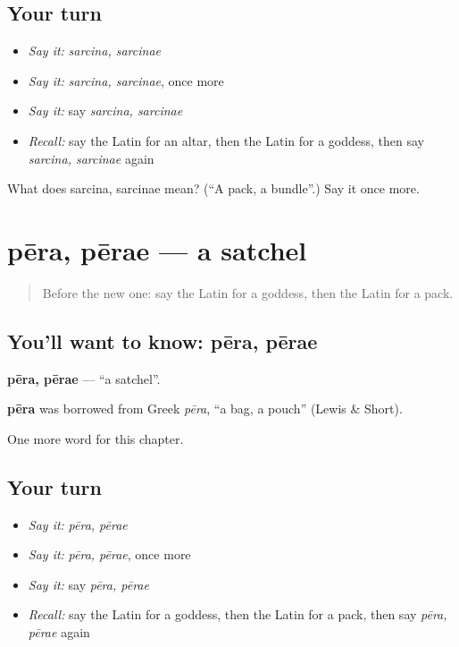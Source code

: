 \subsection*{Your turn}
\begin{itemize}
\raggedright
  \item \emph{Say it:} \emph{sarcina, sarcinae}
  \item \emph{Say it:} \emph{sarcina, sarcinae}, once more
  \item \emph{Say it:} say \emph{sarcina, sarcinae}
  \item \emph{Recall:} say the Latin for an altar, then the Latin for a goddess, then say \emph{sarcina, sarcinae} again
\end{itemize}

\begin{tcolorbox}[breakable,colback=teal!4,colframe=teal!35!black,title={Before you move on}]
What does sarcina, sarcinae mean? (\textquotedblleft{}A pack, a bundle\textquotedblright{}.) Say it once more.
\end{tcolorbox}
\section[pēra, pērae]{pēra, pērae — a satchel}

\label{lesson:LA-C254-pera}



\begin{quote}
Before the new one: say the Latin for a goddess, then the Latin for a pack.
\end{quote}

\subsection*{You'll want to know: pēra, pērae}
\textbf{pēra, pērae} — \textquotedblleft{}a satchel\textquotedblright{}.

\begin{cousinweb}
\textbf{pēra} was borrowed from Greek \emph{pēra}, \textquotedblleft{}a bag, a pouch\textquotedblright{} (Lewis \& Short).
\end{cousinweb}

\begin{grammarlens}[title={What you've built}]
One more word for this chapter.
\end{grammarlens}

\subsection*{Your turn}
\begin{itemize}
\raggedright
  \item \emph{Say it:} \emph{pēra, pērae}
  \item \emph{Say it:} \emph{pēra, pērae}, once more
  \item \emph{Say it:} say \emph{pēra, pērae}
  \item \emph{Recall:} say the Latin for a goddess, then the Latin for a pack, then say \emph{pēra, pērae} again
\end{itemize}

